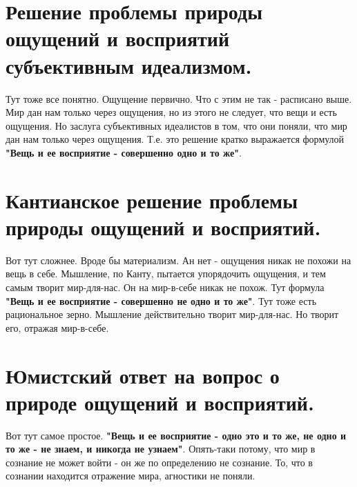 \section{ Решение проблемы природы ощущений и восприятий субъективным идеализмом.}
Тут тоже все понятно. Ощущение первично. Что с этим не так - расписано выше. Мир дан нам только через ощущения, но из этого не следует, что вещи и есть ощущения. Но заслуга субъективных идеалистов в том, что они поняли, что мир дан нам только через ощущения. Т.е. это решение кратко выражается формулой \textbf{"Вещь и ее восприятие - совершенно одно и то же"}.

\section{ Кантианское решение проблемы природы ощущений и восприятий.}
Вот тут сложнее. Вроде бы материализм. Ан нет - ощущения никак не похожи на вещь в себе. Мышление, по Канту, пытается упорядочить ощущения, и тем самым творит мир-для-нас. Он на мир-в-себе никак не похож. Тут формула \textbf{"Вещь и ее восприятие - совершенно не одно и то же"}. Тут тоже есть рациональное зерно. Мышление действительно творит мир-для-нас. Но творит его, отражая мир-в-себе.

\section{ Юмистский ответ на вопрос о природе ощущений и восприятий.}
Вот тут самое простое.  \textbf{"Вещь и ее восприятие - одно это и то же, не одно и то же - не знаем, и никогда не узнаем"}. Опять-таки потому, что мир в сознание не может войти - он же по определению не сознание. То, что в сознании находится отражение мира, агностики не поняли.

